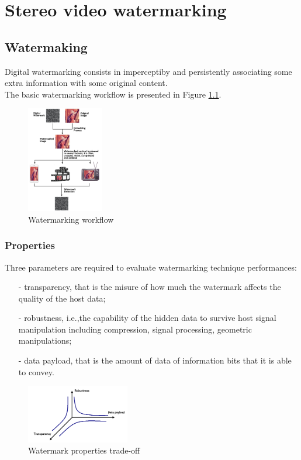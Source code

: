 \chapter{Stereo video watermarking}
\label{wat}

\section{Watermaking}

Digital watermarking consists in imperceptiby and persistently associating some extra information with some original content. \\
The basic watermarking workflow is presented in Figure \ref{fig:workflow}.\\
\begin{figure}[h!]
\centering
\includegraphics[width=0.3\textwidth]{./img/wat_workflow.png}
\caption{\small{Watermarking workflow}}
\label{fig:workflow}
\end{figure}
\newpage
\subsection{Properties}
Three parameters are required to evaluate watermarking technique performances:
\begin{itemize}
\item[-] transparency, that is the misure of how much the watermark affects the quality of the host data;
\item[-] robustness, i.e.,the capability of the hidden data to survive host signal manipulation including compression, signal processing, geometric manipulations;
\item[-] data payload, that is the amount of data of information bits that it is able to convey.
\end{itemize}
\begin{figure}[h!]
\centering
\includegraphics[width=0.4\textwidth]{./img/properties.png}
\caption{\small{Watermark properties trade-off}}
\label{fig:properties}
\end{figure}

